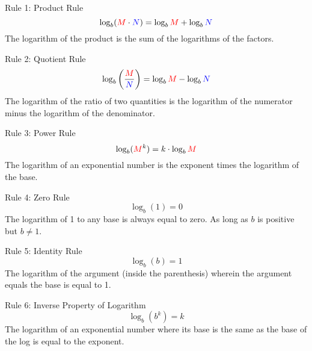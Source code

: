 \begin{framed}
  \noindent Rule 1: Product Rule
  \begin{equation*}
    \log_b(\textcolor{red}M \cdot \textcolor{blue}N) 
    = \log_b \textcolor{red}M + \log_b \textcolor{blue}N
  \end{equation*}
  \noindent The logarithm of the product is the sum of the logarithms of the 
  factors.
\end{framed}

\begin{framed}
  \noindent Rule 2: Quotient Rule
  \begin{equation*}
    \log_b \left(\frac{\textcolor{red}M}{\textcolor{blue}N}\right) 
    = \log_b \textcolor{red}M - \log_b \textcolor{blue}N
  \end{equation*}
  \noindent The logarithm of the ratio of two quantities is the logarithm of 
  the numerator minus the logarithm of the denominator.
\end{framed}

\begin{framed}
  \noindent Rule 3: Power Rule 
  \begin{equation*}
    \log_b (\textcolor{red}M^k) = k \cdot \log_b \textcolor{red}M
  \end{equation*}
  \noindent The logarithm of an exponential number is the exponent times the 
  logarithm of the base.
\end{framed}

\begin{framed}
  \noindent Rule 4: Zero Rule 
  \begin{equation*}
    \log_b (1) = 0
  \end{equation*}
  \noindent The logarithm of 1 to any base is always equal to zero. As long as
  $b$ is positive but $b \neq 1$.
\end{framed}

\begin{framed}
  \noindent Rule 5: Identity Rule 
  \begin{equation*}
    \log_b (b) = 1
  \end{equation*}
  \noindent The logarithm of the argument (inside the parenthesis) wherein the 
  argument equals the base is equal to 1.
\end{framed}

\begin{framed}
  \noindent Rule 6: Inverse Property of Logarithm
  \begin{equation*}
    \log_b (b^k) = k
  \end{equation*}
  \noindent The logarithm of an exponential number where its base is the same 
  as the base of the log is equal to the exponent.
\end{framed}

